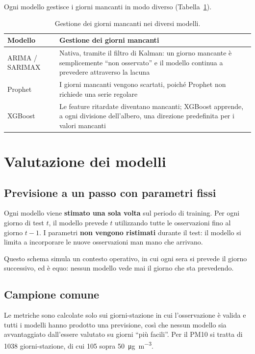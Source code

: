 \documentclass[11pt]{report}
\begin{document}
Ogni modello gestisce i giorni mancanti in modo diverso
(Tabella~\ref{tab:fc_mancanti}).

\begin{table}[H]
  \centering
  \caption{Gestione dei giorni mancanti nei diversi modelli.}
  \label{tab:fc_mancanti}
  \small
  \begin{tabularx}{\textwidth}{@{}l X@{}}
    \toprule
    \textbf{Modello} & \textbf{Gestione dei giorni mancanti} \\
    \midrule
    ARIMA / SARIMAX & Nativa, tramite il filtro di Kalman: un giorno mancante è semplicemente ``non osservato'' e il modello continua a prevedere attraverso la lacuna \\
    \addlinespace
    Prophet & I giorni mancanti vengono scartati, poiché Prophet non richiede una serie regolare \\
    \addlinespace
    XGBoost & Le feature ritardate diventano mancanti; XGBoost apprende, a ogni divisione dell'albero, una direzione predefinita per i valori mancanti \\
    \bottomrule
  \end{tabularx}
\end{table}

\section{Valutazione dei modelli}
\label{sec:fc_valutazione}

\subsection{Previsione a un passo con parametri fissi}
Ogni modello viene \textbf{stimato una sola volta} sul periodo di training. Per
ogni giorno di test $t$, il modello prevede $t$ utilizzando tutte le osservazioni
fino al giorno $t-1$. I parametri \textbf{non vengono ristimati} durante il test:
il modello si limita a incorporare le nuove osservazioni man mano che arrivano.

Questo schema simula un contesto operativo, in cui ogni sera si prevede il giorno
successivo, ed è equo: nessun modello vede mai il giorno che sta prevedendo.

\subsection{Campione comune}
Le metriche sono calcolate solo sui giorni-stazione in cui l'osservazione è valida
e tutti i modelli hanno prodotto una previsione, così che nessun modello sia
avvantaggiato dall'essere valutato su giorni ``più facili''. Per il PM10 si tratta
di \num{1038} giorni-stazione, di cui 105 sopra
\SI{50}{\micro\gram\per\cubic\metre}.
\end{document}
